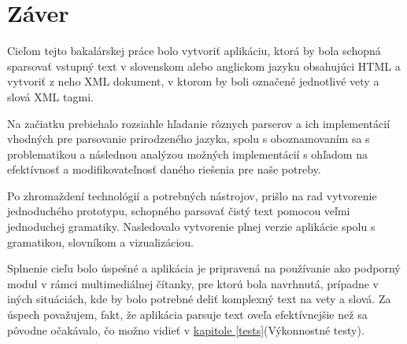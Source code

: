 \documentclass[12pt,a4paper]{report}
\theoremstyle{definition}
\theoremstyle{remark}
\begin{document}
%
%
%

\chapter{Záver}
Cieľom tejto bakalárskej práce bolo vytvoriť aplikáciu, ktorá by bola schopná sparsovať vstupný text v slovenskom alebo anglickom jazyku obsahujúci HTML a vytvoriť z neho XML dokument, v ktorom by boli označené jednotlivé vety a slová XML tagmi.

Na začiatku prebiehalo rozsiahle hľadanie rôznych parserov a ich implementácií vhodných pre parsovanie prirodzeného jazyka, spolu s oboznamovaním sa s problematikou a následnou analýzou možných implementácií s ohľadom na efektívnosť a modifikovateľnosť daného riešenia pre naše potreby.

Po zhromaždení technológií a potrebných nástrojov, prišlo na rad vytvorenie jednoduchého prototypu, schopného parsovať čistý text pomocou veľmi jednoduchej gramatiky. Nasledovalo vytvorenie plnej verzie aplikácie spolu s gramatikou, slovníkom a vizualizáciou. 

Splnenie cieľu bolo úspešné a aplikácia je pripravená na používanie ako podporný modul v rámci multimediálnej čítanky, pre ktorú bola navrhnutá, prípadne v iných situáciách, kde by bolo potrebné deliť komplexný text na vety a slová. Za  úspech považujem, fakt, že aplikácia parsuje text oveľa efektívnejšie než sa pôvodne očakávalo, čo možno vidieť v \hyperref[tests]{kapitole \ref{tests}}(Výkonnostné testy).
\end{document}
